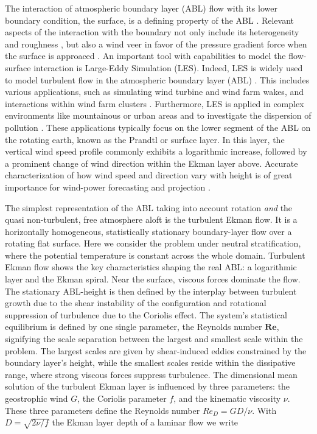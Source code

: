 \documentclass[draft,a4paper,11pt]{article}
\newcommand{\todo}[1]{\textcolor{red}{$[$#1$]$}}
\newcommand{\RE}{\mathbf{Re}}
\begin{document}
The interaction of atmospheric boundary layer  (ABL) flow with its lower boundary condition, the surface, is a defining property of the ABL \citep{stull:1988}. Relevant aspects of the interaction with the boundary not only include its heterogeneity \citep{avissar:MWR1989,giorgi:RG1997,claussen:BM1991,garratt:BM1990} and roughness \citep{monin:ARF1970,brutsaert:WRR1975,raupach:AMR1991,kostelecky:JFM2024}, but also a wind veer in favor of the pressure gradient force when the surface is approaced \citep{ekman:AMA1905}. An important tool with capabilities to model the flow-surface interaction is Large-Eddy Simulation (LES). Indeed, LES is widely used to model turbulent flow in the atmospheric boundary layer (ABL) \citep{stoll2020large}. This includes various applications, such as simulating wind turbine and wind farm wakes, and interactions within wind farm clusters \citep{porte2011large,mehta2014large,breton2017survey}. Furthermore, LES is applied in complex environments like mountainous or urban areas \citep{stoll2020large,garcia2018predictive} and to investigate the dispersion of pollution \cite{han2018large}. These applications typically focus on the lower segment of the ABL on the rotating earth, known as the Prandtl or surface layer. In this layer, the vertical wind speed profile commonly exhibits a logarithmic increase, followed by a prominent change of wind direction within the Ekman layer above. Accurate characterization of how wind speed and direction vary with height is of great importance for wind-power forecasting and projection \citep{optis2014moving}.

The simplest representation of the ABL taking into account rotation \emph{and} the quasi non-turbulent, free atmosphere aloft is the turbulent Ekman flow. It is a horizontally homogeneous, statistically stationary boundary-layer flow over a rotating flat surface. Here we consider the problem under neutral stratification, where the potential temperature is constant across the whole domain. Turbulent Ekman flow shows the key characteristics shaping the real ABL: a logarithmic layer and the Ekman spiral. Near the surface, viscous forces dominate the flow. The stationary ABL-height is then defined by the interplay between turbulent growth due to the shear instability of the configuration \citep{lilly1966instability} and rotational suppression of turbulence due to the Coriolis effect. The system's statistical equilibrium is defined by one single parameter, the Reynolds number $\RE$, signifying the scale separation between the largest and smallest scale within the problem. The largest scales are given by shear-induced eddies constrained by the boundary layer's height, while the smallest scales reside within the dissipative range, where strong viscous forces suppress turbulence. The dimensional mean solution of the turbulent Ekman layer is influenced by three parameters: the geostrophic wind $G$, the Coriolis parameter $f$, and the kinematic viscosity $\nu$. These three parameters define the Reynolds number $Re_D = GD/\nu$. With $D=\sqrt{2\nu/f}$ the Ekman layer depth of a laminar flow we write
\end{document}
